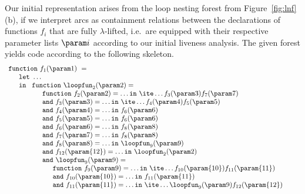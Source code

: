 Our initial representation arises from the loop nesting forest from
Figure~\ref{fig:lnf}(b), if we interpret arcs as containment
relations between the declarations of functions $f_i$ that are fully
$\lambda$-lifted, i.e.~are equipped with their respective parameter
lists $\param i$ according to our initial liveness analysis. The given
forest yields code according to the following skeleton.
\begin{equation}
\label{FunctionalLoopNest1}
\begin{array}{l}
\mathtt{function}\ f_1(\param 1)\ = \\
  \quad
  \begin{array}{l}
     \mathtt{let}\ \ldots  \\
     \mathtt{in}\ 
     \begin{array}[t]{l}
       \mathtt{function}\ \loopfun_2 (\param 2) =  \\
       \quad \begin{array}[t]{l}
               \mathtt{function}\ f_2(\param 2) = \ldots \mathtt{in}\ \ite \ldots {f_3(\param 3)} {f_7(\param 7)}\\
               \mathtt{and}\ f_3(\param 3) = \ldots \mathtt{in}\ \ite \ldots {f_4(\param 4)} {f_5(\param 5)}\\
               \mathtt{and}\ f_4(\param 4) = \ldots \mathtt{in}\ f_6(\param 6)\\
               \mathtt{and}\ f_5(\param 5) = \ldots \mathtt{in}\ f_6(\param 6)\\
               \mathtt{and}\ f_6(\param 6) = \ldots \mathtt{in}\ f_8(\param 8)\\
               \mathtt{and}\ f_7(\param 7) = \ldots \mathtt{in}\ f_8(\param 8)\\
               \mathtt{and}\ f_8(\param 8) = \ldots \mathtt{in}\ \loopfun_9(\param 9)\\
               \mathtt{and}\ f_{12}(\param {12}) = \ldots \mathtt{in}\ \loopfun_2(\param 2)\\
               \mathtt{and}\ \loopfun_9 (\param 9) =  \\
                    \quad \begin{array}[t]{l}
                             \mathtt{function}\ f_9(\param 9) = \ldots \mathtt{in}\ \ite \ldots {f_{10}(\param {10})} {f_{11}(\param{11})}\\
                             \mathtt{and}\ f_{10}(\param {10}) = \ldots \mathtt{in}\ f_{11}(\param{11})\\
                             \mathtt{and}\ f_{11}(\param {11}) = \ldots \mathtt{in}\ \ite \ldots {\loopfun_9(\param 9)} {f_{12}(\param{12})}\\

\end{array}
\end{array}
\end{array}
\end{array}
\end{array}
\end{equation}
